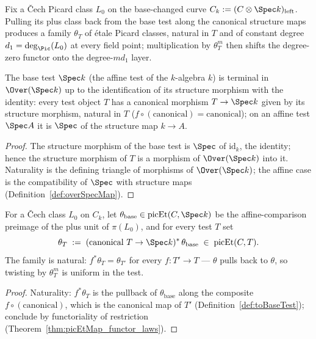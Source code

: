Fix a \v Cech Picard class \(L_0\) on the base-changed curve
\(C_k := (C \otimes \Spec k)_{\mathrm{left}}\). Pulling its plus class back from the base
test along the canonical structure maps produces a family \(\theta_T\) of \'etale Picard
classes, natural in \(T\) and of constant degree \(d_1 = \deg_{\Pic}(L_0)\) at every field
point; multiplication by \(\theta_T^{m}\) then shifts the degree-zero functor onto the
degree-\(m d_1\) layer.

\begin{definition}
  \label{def:toBaseTest}
  \leanok
  The base test \(\Spec k\) (the affine test of the \(k\)-algebra \(k\)) is terminal in
  \(\Over(\Spec k)\) up to the identification of its structure morphism with the identity:
  every test object \(T\) has a canonical morphism \(T \to \Spec k\) given by its structure
  morphism, natural in \(T\) (\(f \circ (\text{canonical}) = \text{canonical}\)); on an
  affine test \(\Spec A\) it is \(\Spec\) of the structure map \(k \to A\).
\end{definition}
\begin{proof}
  \leanok
  The structure morphism of the base test is \(\Spec\) of \(\mathrm{id}_k\), the identity;
  hence the structure morphism of \(T\) is a morphism of \(\Over(\Spec k)\) into it.
  Naturality is the defining triangle of morphisms of \(\Over(\Spec k)\); the affine case is
  the compatibility of \(\Spec\) with structure maps (Definition~\ref{def:overSpecMap}).
\end{proof}

\begin{definition}
  \label{def:thetaFamily}
  \leanok
  For a \v Cech class \(L_0\) on \(C_k\), let
  \(\theta_{\mathrm{base}} \in \mathrm{picEt}(C, \Spec k)\) be the affine-comparison preimage
  of the plus unit of \(\pi(L_0)\), and for every test \(T\) set
  \[
    \theta_T \;:=\; (\text{canonical } T \to \Spec k)^{*}\,\theta_{\mathrm{base}}
      \;\in\; \mathrm{picEt}(C,T).
  \]
  The family is natural: \(f^{*}\theta_T = \theta_{T'}\) for every \(f \colon T' \to T\) —
  \(\theta\) pulls back to \(\theta\), so twisting by \(\theta_T^{m}\) is uniform in the
  test.
\end{definition}
\begin{proof}
  \leanok
  Naturality: \(f^{*}\theta_T\) is the pullback of \(\theta_{\mathrm{base}}\) along the
  composite \(f \circ (\text{canonical})\), which is the canonical map of \(T'\)
  (Definition~\ref{def:toBaseTest}); conclude by functoriality of restriction
  (Theorem~\ref{thm:picEtMap_functor_laws}).
\end{proof}

